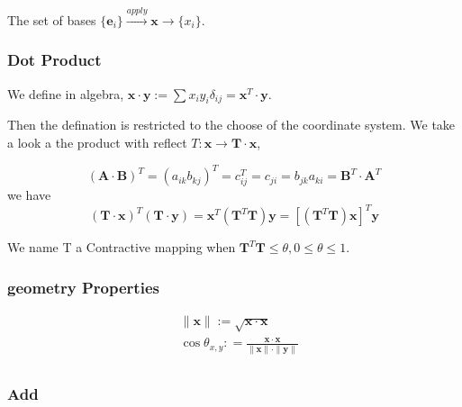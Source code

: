 The set of bases $\{ \boldsymbol e_i  \}  \xrightarrow{apply} \boldsymbol{x} \longrightarrow    \{ x_i \}   $.


\subsubsection{Dot Product}

We define in algebra, $ \boldsymbol{x} \cdot \boldsymbol{y} := \sum{x_iy_i \delta _{ij}} = \boldsymbol{x}^T \cdot \boldsymbol{y}$.

Then the defination is restricted to the choose of the coordinate system. We take a look a the product with reflect $T : \boldsymbol x \rightarrow  \boldsymbol{T} \cdot \boldsymbol{x}$,

\begin{equation}
    (\boldsymbol A \cdot \boldsymbol  B)^T = (a_{ik}b_{kj})^T = c_{ij}^T = c_{ji} = b_{jk}a_{ki} = \boldsymbol B^T \cdot \boldsymbol A^T
\end{equation}
we have 
\begin{equation}
    (\boldsymbol T \cdot \boldsymbol  x)^T(\boldsymbol T \cdot \boldsymbol  y) =  \boldsymbol x^T (\boldsymbol T^T \boldsymbol T) \boldsymbol y = [(\boldsymbol T^T \boldsymbol T) \boldsymbol x]^T \boldsymbol y
\end{equation}

We name T a Contractive mapping when $\boldsymbol T^T \boldsymbol T \leqslant   \theta, 0 \leqslant \theta \leqslant 1$.

\subsubsection{geometry Properties}

\begin{equation}
    \begin{split}
    &\parallel \boldsymbol{x} \parallel := \sqrt{\boldsymbol x \cdot \boldsymbol x}\\
    &\cos {\theta_{x,y}} : = \frac
    {\boldsymbol x \cdot \boldsymbol x}
    {\parallel \boldsymbol{x} \parallel \cdot \parallel \boldsymbol{y} \parallel}\\
\end{split}
\end{equation}

\subsubsection{Add}

